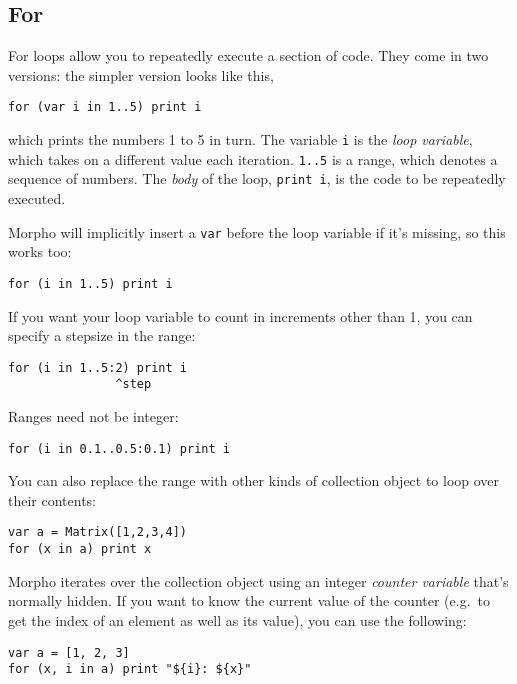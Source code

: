 \hypertarget{for}{%
\subsection{For}\label{for}}

For loops allow you to repeatedly execute a section of code. They come
in two versions: the simpler version looks like this,

\begin{lstlisting}
for (var i in 1..5) print i
\end{lstlisting}

which prints the numbers 1 to 5 in turn. The variable \texttt{i} is the
\emph{loop variable}, which takes on a different value each iteration.
\texttt{1..5} is a range, which denotes a sequence of numbers. The
\emph{body} of the loop, \texttt{print\ i}, is the code to be repeatedly
executed.

Morpho will implicitly insert a \texttt{var} before the loop variable if
it's missing, so this works too:

\begin{lstlisting}
for (i in 1..5) print i
\end{lstlisting}

If you want your loop variable to count in increments other than 1, you
can specify a stepsize in the range:

\begin{lstlisting}
for (i in 1..5:2) print i
               ^step
\end{lstlisting}

Ranges need not be integer:

\begin{lstlisting}
for (i in 0.1..0.5:0.1) print i
\end{lstlisting}

You can also replace the range with other kinds of collection object to
loop over their contents:

\begin{lstlisting}
var a = Matrix([1,2,3,4])
for (x in a) print x
\end{lstlisting}

Morpho iterates over the collection object using an integer
\emph{counter variable} that's normally hidden. If you want to know the
current value of the counter (e.g.~to get the index of an element as
well as its value), you can use the following:

\begin{lstlisting}
var a = [1, 2, 3]
for (x, i in a) print "${i}: ${x}"
\end{lstlisting}


